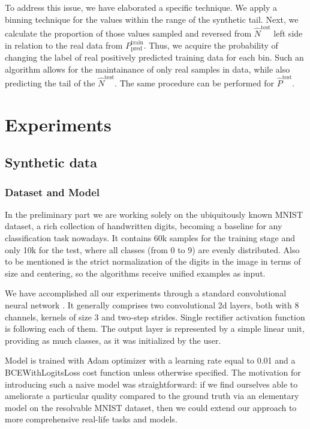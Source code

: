 \documentclass{article}
\begin{document}
To address this issue, we have elaborated a specific technique. We apply a binning technique for the values within the range of the synthetic tail. Next, we calculate the proportion of those values sampled and reversed from $ \hat{N}^{\text{test}}$ left side in relation to the real data from $P^{\text{train}}_{\text{pred}}$. Thus, we acquire the probability of changing the label of real positively predicted training data for each bin. Such an algorithm allows for the maintainance of only real samples in data, while also predicting the tail of the $ \hat{N}^{\text{test}}$. The same procedure can be performed for $ \hat{P}^{\text{test}}$.

\section{Experiments}
\subsection{Synthetic data}

\subsubsection{Dataset and Model}

In the preliminary part we are working solely on the ubiquitously known MNIST dataset, a rich collection of handwritten digits, becoming a baseline for any classification task nowadays. It contains 60k samples for the training stage and only 10k for the test, where all classes (from 0 to 9) are evenly distributed. Also to be mentioned is the strict normalization of the digits in the image in terms of size and centering, so the algorithms receive unified examples as input.

We have accomplished all our experiments through a standard convolutional neural network \cite{cnn}. It generally comprises two convolutional 2d layers, both with 8 channels, kernels of size 3 and two-step strides. Single rectifier activation function is following each of them.  The output layer is represented by a simple linear unit, providing as much classes, as it was initialized by the user.   

Model is trained with Adam optimizer with a learning rate equal to 0.01 and a BCEWithLogitsLoss cost function unless otherwise specified. The motivation for introducing such a naive model was straightforward: if we find ourselves able to ameliorate a particular quality compared to the ground truth via an elementary model on the resolvable MNIST dataset, then we could extend our approach to more comprehensive real-life tasks and models.
\end{document}
